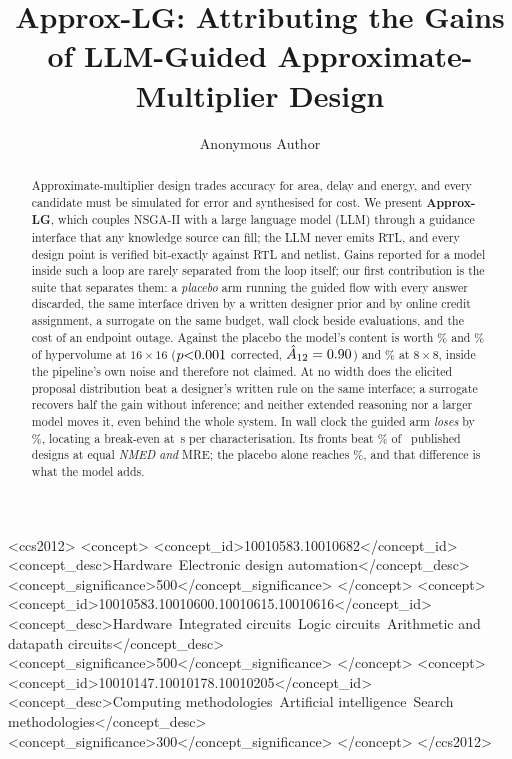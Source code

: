 \documentclass[acmsmall,review,anonymous]{acmart}
\newcommand{\nmed}{\textit{NMED}}
\begin{document}
\title{Approx-LG: Attributing the Gains of LLM-Guided
Approximate-Multiplier Design}

\author{Anonymous Author}

\renewcommand{\shortauthors}{Anonymous}

\begin{abstract}
Approximate-multiplier design trades accuracy for area, delay and energy, and
every candidate must be simulated for error and synthesised for cost.  We
present \textbf{Approx-LG}, which couples NSGA-II with a large language model
(LLM) through a guidance interface that any knowledge source can fill; the LLM
never emits RTL, and every design point is verified bit-exactly against RTL and
netlist.  Gains reported for a model inside such a loop are rarely separated
from the loop itself; our first contribution is the suite that separates them: a
\emph{placebo} arm running the guided flow with every answer discarded, the same
interface driven by a written designer prior and by online credit assignment, a
surrogate on the same budget, wall clock beside evaluations, and the cost of an
endpoint outage.  Against the placebo the model's content is worth
\ShamSixteenU\% and \ShamSixteenS\% of hypervolume at $16\times16$
($p{<}0.001$ corrected, $\hat{A}_{12}=0.90$) and \ShamEight\%
at $8\times8$, inside the pipeline's own noise and therefore not claimed.  At no
width does the elicited proposal distribution beat a designer's written rule on
the same interface; a surrogate recovers half the gain without inference; and
neither extended reasoning nor a larger model moves it, even behind the whole
system.  In wall clock the guided arm \emph{loses} by \EqTimeNSGA\%, locating a
break-even at \BreakEvenNSGA\,s per characterisation.  Its fronts beat
\SotaSixteenADP\% of \NrefSixteen\ published designs at equal \nmed{}
\emph{and} MRE; the placebo alone reaches \SotaShamSixteenADP\%, and that
difference is what the model adds.
\end{abstract}

\begin{CCSXML}
<ccs2012>
<concept>
<concept_id>10010583.10010682</concept_id>
<concept_desc>Hardware~Electronic design automation</concept_desc>
<concept_significance>500</concept_significance>
</concept>
<concept>
<concept_id>10010583.10010600.10010615.10010616</concept_id>
<concept_desc>Hardware~Integrated circuits~Logic circuits~Arithmetic and datapath circuits</concept_desc>
<concept_significance>500</concept_significance>
</concept>
<concept>
<concept_id>10010147.10010178.10010205</concept_id>
<concept_desc>Computing methodologies~Artificial intelligence~Search methodologies</concept_desc>
<concept_significance>300</concept_significance>
</concept>
</ccs2012>
\end{CCSXML}
\end{document}
